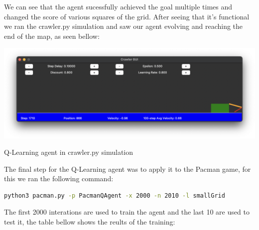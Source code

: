 \documentclass{article}
\begin{document}
We can see that the agent sucessfully achieved the goal multiple times and changed the score of various squares of the grid. After seeing that it's functional we ran the crawler.py simulation and saw our agent evolving and reaching the end of the map, as seen bellow:

\begin{table}[ht!]
  \begin{center}
    \includegraphics[width=1\textwidth]{images/crawler.png}
  \end{center}
\caption{Q-Learning agent in crawler.py simulation}
\end{table}

The final step for the Q-Learning agent was to apply it to the Pacman game, for this we ran the following command:

\begin{lstlisting}[language=bash, frame=tlbr, framesep=6pt, backgroundcolor=\color{light-gray}]
  python3 pacman.py -p PacmanQAgent -x 2000 -n 2010 -l smallGrid
\end{lstlisting}

The first 2000 interations are used to train the agent and the last 10 are used to test it, the table bellow shows the reults of the training:
\end{document}
